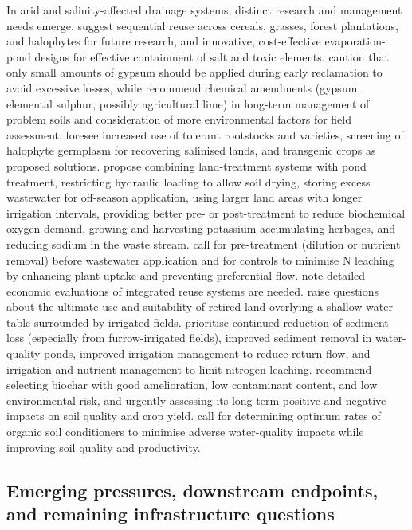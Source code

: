 In arid and salinity-affected drainage systems, distinct research and management needs emerge. \textcite{Sharma2004} suggest sequential reuse across cereals, grasses, forest plantations, and halophytes for future research, and innovative, cost-effective evaporation-pond designs for effective containment of salt and toxic elements. \textcite{MANN1982} caution that only small amounts of gypsum should be applied during early reclamation to avoid excessive losses, while \textcite{He2015} recommend chemical amendments (gypsum, elemental sulphur, possibly agricultural lime) in long-term management of problem soils and consideration of more environmental factors for field assessment. \textcite{Cuevas2019} foresee increased use of tolerant rootstocks and varieties, screening of halophyte germplasm for recovering salinised lands, and transgenic crops as proposed solutions. \textcite{Christen2010} propose combining land-treatment systems with pond treatment, restricting hydraulic loading to allow soil drying, storing excess wastewater for off-season application, using larger land areas with longer irrigation intervals, providing better pre- or post-treatment to reduce biochemical oxygen demand, growing and harvesting potassium-accumulating herbages, and reducing sodium in the waste stream. \textcite{Duan2015} call for pre-treatment (dilution or nutrient removal) before wastewater application and for controls to minimise N leaching by enhancing plant uptake and preventing preferential flow. \textcite{Mitchell2000} note detailed economic evaluations of integrated reuse systems are needed. \textcite{Purkey2001} raise questions about the ultimate use and suitability of retired land overlying a shallow water table surrounded by irrigated fields. \textcite{Bjorneberg2020} prioritise continued reduction of sediment loss (especially from furrow-irrigated fields), improved sediment removal in water-quality ponds, improved irrigation management to reduce return flow, and irrigation and nutrient management to limit nitrogen leaching. \textcite{Tian2023b} recommend selecting biochar with good amelioration, low contaminant content, and low environmental risk, and urgently assessing its long-term positive and negative impacts on soil quality and crop yield. \textcite{Zhang2015} call for determining optimum rates of organic soil conditioners to minimise adverse water-quality impacts while improving soil quality and productivity.

\subsection{Emerging pressures, downstream endpoints, and remaining infrastructure questions}


